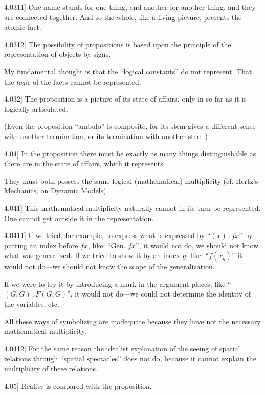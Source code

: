 \documentclass[12pt,oneside]{book}[2007/10/19]
\newcommand{\PropositionE}[2]{%
  \item[\phantomsection\label{PropE:#1}\PropGRef{#1}] #2%
}
\newcommand{\PropGRef}[1]{\hyperref[PropG:#1]{#1}}
\newcommand{\DotOp}{\mathbin{.}}
\begin{document}
\begin{propositions}
\PropositionE{4.0311}
{One name stands for one thing, and another
for another thing, and they are connected together.
And so the whole, like a living picture, presents
the atomic fact.}


\PropositionE{4.0312}
{The possibility of propositions is based upon the
principle of the representation of objects by signs.

My fundamental thought is that the ``logical
constants'' do not represent. That the \emph{logic} of the
facts cannot be represented.}


\PropositionE{4.032}
{The proposition is a picture of its state of
affairs, only in so far as it is logically articulated.

(Even the proposition ``ambulo'' is composite,
for its stem gives a different sense with another
termination, or its termination with another
stem.)}


\PropositionE{4.04}
{In the proposition there must be exactly as
many things distinguishable as there are in the
state of affairs, which it represents.

They must both possess the same logical
(mathematical) multiplicity (cf. Hertz's Mechanics,
on Dynamic Models).}


\PropositionE{4.041}
{This mathematical multiplicity naturally cannot
in its turn be represented. One cannot get outside
it in the representation.}


\PropositionE{4.0411}
{If we tried, for example, to express what is
expressed by ``$(x) \DotOp fx$'' by putting an index before
$fx$, like: ``Gen. $fx$'', it would not do, we should
not know what was generalized. If we tried to
show it by an index $g$, like: ``$f(x_{g})$'' it would not
do---we should not know the scope of the generalization.

If we were to try it by introducing a mark
in the argument places, like ``$(G,G) \DotOp F(G,G)$'', it
would not do---we could not determine the identity
of the variables, etc.

All these ways of symbolizing are inadequate
because they have not the necessary mathematical
multiplicity.}


\PropositionE{4.0412}
{For the same reason the idealist explanation of
the seeing of spatial relations through ``spatial
spectacles'' does not do, because it cannot explain
the multiplicity of these relations.}


\PropositionE{4.05}
{Reality is compared with the proposition.}



\end{propositions}
\end{document}
